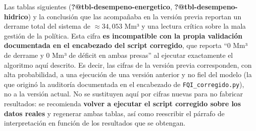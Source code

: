 \documentclass[
  spanish,
  letterpaper,
]{scrreprt}
\theoremstyle{definition}
\theoremstyle{remark}
\begin{document}
\begin{tcolorbox}[enhanced jigsaw, arc=.35mm, bottomrule=.15mm, bottomtitle=1mm, breakable, colback=white, colbacktitle=quarto-callout-warning-color!10!white, colframe=quarto-callout-warning-color-frame, coltitle=black, left=2mm, leftrule=.75mm, opacityback=0, opacitybacktitle=0.6, rightrule=.15mm, title=\textcolor{quarto-callout-warning-color}{\faExclamationTriangle}\hspace{0.5em}{Cifras pendientes de regenerar}, titlerule=0mm, toprule=.15mm, toptitle=1mm]

Las tablas siguientes (\textbf{?@tbl-desempeno-energetico},
\textbf{?@tbl-desempeno-hidrico}) y la conclusión que las acompañaba en
la versión previa reportan un derrame total del sistema de
\(\approx 34{,}053\) Mm³ y una lectura crítica sobre la mala gestión de
la política. Esta cifra \textbf{es incompatible con la propia validación
documentada en el encabezado del script corregido}, que reporta ``0 Mm³
de derrame y 0 Mm³ de déficit en ambas presas'' al ejecutar exactamente
el algoritmo aquí descrito. Es decir, las cifras de la versión previa
corresponden, con alta probabilidad, a una ejecución de una versión
anterior y no fiel del modelo (la que originó la auditoría documentada
en el encabezado de \texttt{FQI\_corregido.py}), no a la versión actual.
No se sustituyen aquí por cifras nuevas para no fabricar resultados: se
recomienda \textbf{volver a ejecutar el script corregido sobre los datos
reales} y regenerar ambas tablas, así como reescribir el párrafo de
interpretación en función de los resultados que se obtengan.

\end{tcolorbox}
\end{document}
